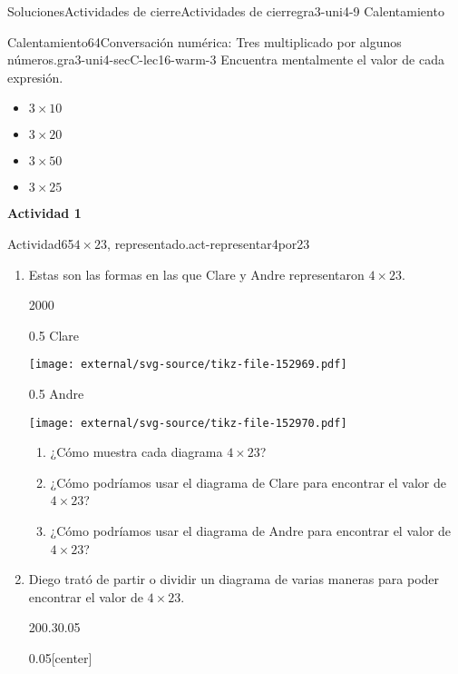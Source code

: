 \documentclass[twoside,10pt,]{article}
\begin{document}
\begin{solutions-section}{Soluciones}{Actividades de cierre}{}{Actividades de cierre}{}{}{gra3-uni4-9}
{\space\textperiodcentered\space{}Calentamiento}
\begin{explorationsolution}{Calentamiento}{64}{Conversación numérica: Tres multiplicado por algunos números.}{gra3-uni4-secC-lec16-warm-3}%
Encuentra mentalmente el valor de cada expresión.%
%
\begin{itemize}[label=\textbullet]
\item{}\(\displaystyle 3\times 10\)%
\item{}\(\displaystyle 3\times 20\)%
\item{}\(\displaystyle 3\times 50\)%
\item{}\(\displaystyle 3\times 25\)%
\end{itemize}
\end{explorationsolution}%
\par\medskip
\noindent\textbf{\large{}\space\textperiodcentered\space{}Actividad 1}
\begin{activitysolution}{Actividad}{65}{\(4\times 23\), representado.}{act-representar4por23}%
%
\begin{enumerate}
\item{}Estas son las formas en las que Clare y Andre representaron \(4\times 23\).%
\begin{sidebyside}{2}{0}{0}{0}%
\begin{sbspanel}{0.5}%
Clare%
\par
\texttt{[image: external/svg-source/tikz-file-152969.pdf]}
\end{sbspanel}%
\begin{sbspanel}{0.5}%
Andre%
\par
\texttt{[image: external/svg-source/tikz-file-152970.pdf]}
\end{sbspanel}%
\end{sidebyside}%
%
\begin{enumerate}
\item{}¿Cómo muestra cada diagrama \(4\times 23\)?%
\item{}¿Cómo podríamos usar el diagrama de Clare para encontrar el valor de \(4\times 23\)?%
\item{}¿Cómo podríamos usar el diagrama de Andre para encontrar el valor de \(4\times 23\)?%
\end{enumerate}
\item{}Diego trató de partir o dividir un diagrama de varias maneras para poder encontrar el valor de \(4\times 23\).%
\begin{sidebyside}{2}{0}{0.3}{0.05}%
\begin{sbspanel}{0.05}[center]%

\end{sbspanel}
\end{sidebyside}
\end{enumerate}
\end{activitysolution}
\end{solutions-section}
\end{document}
